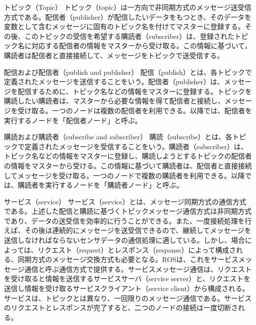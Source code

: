 
\begin{term}{トピック（Topic）}
トピック（topic）は一方向で非同期方式のメッセージ送受信方式である。配信者（publisher）が配信したいデータをもつとき、そのデータを変数として含むメッセージに固有のトピック名を付けてマスターに登録する。その後、このトピックの受信を希望する購読者（subscriber）は、登録されたトピック名に対応する配信者の情報をマスターから受け取る。この情報に基づいて，購読者は配信者と直接接続して、メッセージをトピックで送受信する。
\end{term}


\begin{term}{配信および配信者（publish and publisher）}
配信（publish）とは、各トピックで定義されたメッセージを送信することをいう。配信者（publisher）は、メッセージを配信するために、トピック名などの情報をマスターに登録する。トピックを購読したい購読者は、マスターから必要な情報を得て配信者と接続し、メッセージを受け取る。一つのノードは複数の配信者を利用できる。以降では、配信者を実行するノードを「配信者ノード」と呼ぶ。
\end{term}


\begin{term}{購読および購読者（subscribe and subscriber）}
購読（subscribe）とは、各トピックで定義されたメッセージを受信することをいう。購読者（subscriber）は、トピック名などの情報をマスターに登録し、購読しようとするトピックの配信者の情報をマスターから受ける。この情報に基づいて購読者は、配信者と直接接続してメッセージを受け取る。一つのノードで複数の購読者を利用できる。以降では、購読者を実行するノードを「購読者ノード」と呼ぶ。
\end{term}


\begin{term}{サービス（service）}
サービス（service）とは、メッセージ同期方式の通信方式である。上述した配信と購読に基づくトピックメッセージ通信方式は非同期方式であり、データの送受信を効率的に行うことができる。また、一度接続処理を行えば、その後は連続的にメッセージを送受信できるので、継続してメッセージを送信しなければならないセンサデータの通信処理に適している。しかし、場合によっては、リクエスト（request）とレスポンス（response）によって構成される、同期方式のメッセージ交換方式も必要となる。ROSは、これをサービスメッセージ通信と呼ぶ通信方式で提供する。サービスメッセージ通信は、リクエストを受け取ると情報を送信するサービスサーバ（service server）と、リクエストを送信し情報を受け取るサービスクライアント（service client）から構成される。サービスは、トピックとは異なり、一回限りのメッセージ通信である。サービスのリクエストとレスポンスが完了すると、二つのノードの接続は一度切断される。
\end{term}

